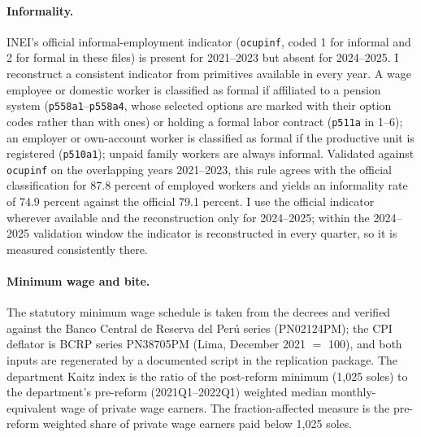 \paragraph{Informality.} INEI's official informal-employment indicator (\texttt{ocupinf},
coded 1 for informal and 2 for formal in these files) is present for 2021--2023 but absent
for 2024--2025. I reconstruct a consistent indicator from primitives available in every
year. A wage employee or domestic worker is classified as formal if affiliated to a
pension system (\texttt{p558a1}--\texttt{p558a4}, whose selected options are marked with
their option codes rather than with ones) or holding a formal labor contract
(\texttt{p511a} in 1--6); an employer or own-account worker is classified as formal if the
productive unit is registered (\texttt{p510a1}); unpaid family workers are always informal.
Validated against \texttt{ocupinf} on the overlapping years 2021--2023, this rule agrees
with the official classification for 87.8 percent of employed workers and yields an
informality rate of 74.9 percent against the official 79.1 percent. I use the official
indicator wherever available and the reconstruction only for 2024--2025; within the
2024--2025 validation window the indicator is reconstructed in every quarter, so it is
measured consistently there.

\paragraph{Minimum wage and bite.} The statutory minimum wage schedule is taken from the
decrees and verified against the Banco Central de Reserva del Perú series (PN02124PM);
the CPI deflator is BCRP series PN38705PM (Lima, December 2021 $=$ 100), and both inputs
are regenerated by a documented script in the replication package. The department Kaitz
index is the ratio of the post-reform minimum (1,025 soles) to the department's
pre-reform (2021Q1--2022Q1) weighted median monthly-equivalent wage of private wage
earners. The fraction-affected measure is the pre-reform weighted share of private wage
earners paid below 1,025 soles.


